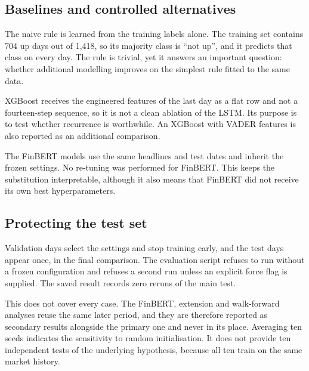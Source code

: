 \subsection{Baselines and controlled alternatives}
The naive rule is learned from the training labels alone. The training set contains 704 up days out of 1,418, so its majority class is ``not up'', and it predicts that class on every day. The rule is trivial, yet it answers an important question: whether additional modelling improves on the simplest rule fitted to the same data.

XGBoost receives the engineered features of the last day as a flat row and not a fourteen-step sequence, so it is not a clean ablation of the LSTM. Its purpose is to test whether recurrence is worthwhile. An XGBoost with VADER features is also reported as an additional comparison.

The FinBERT models use the same headlines and test dates and inherit the frozen settings. No re-tuning was performed for FinBERT. This keeps the substitution interpretable, although it also means that FinBERT did not receive its own best hyperparameters.

\subsection{Protecting the test set}
Validation days select the settings and stop training early, and the test days appear once, in the final comparison. The evaluation script refuses to run without a frozen configuration and refuses a second run unless an explicit force flag is supplied. The saved result records zero reruns of the main test.

This does not cover every case. The FinBERT, extension and walk-forward analyses reuse the same later period, and they are therefore reported as secondary results alongside the primary one and never in its place. Averaging ten seeds indicates the sensitivity to random initialisation. It does not provide ten independent tests of the underlying hypothesis, because all ten train on the same market history.

